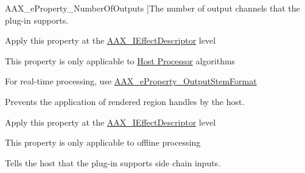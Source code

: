 \begin{Desc}
\begin{description}
{\hypertarget{a00283_a6571f4e41a5dd06e4067249228e2249eab7e07d482d3b6e527fc13bbc9f4eaf63}{}A\+A\+X\+\_\+e\+Property\+\_\+\+Number\+Of\+Outputs\label{a00283_a6571f4e41a5dd06e4067249228e2249eab7e07d482d3b6e527fc13bbc9f4eaf63}
}]The number of output channels that the plug-\/in supports. \begin{DoxyItemize}
\item Apply this property at the \hyperlink{a00096}{A\+A\+X\+\_\+\+I\+Effect\+Descriptor} level \item This property is only applicable to \hyperlink{a00334}{Host Processor} algorithms\end{DoxyItemize}
For real-\/time processing, use \hyperlink{a00283_a6571f4e41a5dd06e4067249228e2249ea211fdc6277e7fa652b5d482e810b0bc9}{A\+A\+X\+\_\+e\+Property\+\_\+\+Output\+Stem\+Format} \item[{\em 
\hypertarget{a00283_a6571f4e41a5dd06e4067249228e2249ea943c37cd8a41a4d271dd28c89b518044}{}A\+A\+X\+\_\+e\+Property\+\_\+\+Disable\+Handles\label{a00283_a6571f4e41a5dd06e4067249228e2249ea943c37cd8a41a4d271dd28c89b518044}
}]Prevents the application of rendered region handles by the host. \begin{DoxyItemize}
\item Apply this property at the \hyperlink{a00096}{A\+A\+X\+\_\+\+I\+Effect\+Descriptor} level \item This property is only applicable to offline processing \end{DoxyItemize}
\item[{\em 
\hypertarget{a00283_a6571f4e41a5dd06e4067249228e2249ea3399fcd8ff459de1e3de0c98d40a5094}{}A\+A\+X\+\_\+e\+Property\+\_\+\+Supports\+Side\+Chain\+Input\label{a00283_a6571f4e41a5dd06e4067249228e2249ea3399fcd8ff459de1e3de0c98d40a5094}
}]Tells the host that the plug-\/in supports side chain inputs. \begin{DoxyItemize}

\end{DoxyItemize}
\end{description}
\end{Desc}
